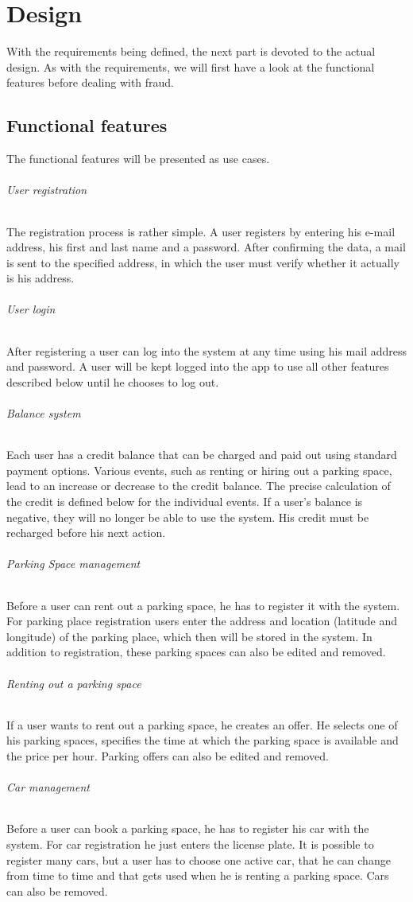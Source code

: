\chapter{Design}
\label{ch:Design}
With the requirements being defined, the next part is devoted to the actual design. As with the requirements, we will first have a look at the functional features before dealing with fraud.

\section{Functional features}
The functional features will be presented as use cases.
\subparagraph{User registration} The registration process is rather simple. A user registers by entering his e-mail address, his first and last name and a password. After confirming the data, a mail is sent to the specified address, in which the user must verify whether it actually is his address.

\subparagraph{User login} After registering a user can log into the system at any time using his mail address and password. A user will be kept logged into the app to use all other features described below until he chooses to log out.

\subparagraph{Balance system} Each user has a credit balance that can be charged and paid out using standard payment options. Various events, such as renting or hiring out a parking space, lead to an increase or decrease to the credit balance. The precise calculation of the credit is defined below for the individual events. If a user's balance is negative, they will no longer be able to use the system. His credit must be recharged before his next action.

\subparagraph{Parking Space management} Before a user can rent out a parking space, he has to register it with the system. For parking place registration users enter the address and location (latitude and longitude) of the parking place, which then will be stored in the system. In addition to registration, these parking spaces can also be edited and removed.

\subparagraph{Renting out a parking space} If a user wants to rent out a parking space, he creates an offer. He selects one of his parking spaces, specifies the time at which the parking space is available and the price per hour. Parking offers can also be edited and removed.

\subparagraph{Car management} Before a user can book a parking space, he has to register his car with the system. For car registration he just enters the license plate. It is possible to register many cars, but a user has to choose one active car, that he can change from time to time and that gets used when he is renting a parking space. Cars can also be removed.


